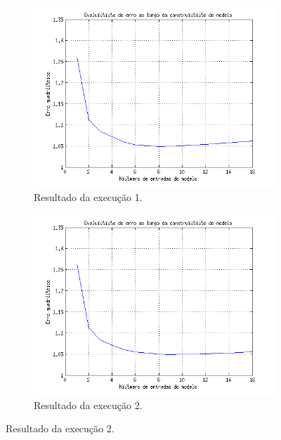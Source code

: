 \begin{figure}[H] 
				
			\centering
			
				\begin{subfigure}{.5\textwidth}
				  \centering
				  \includegraphics[width=1\linewidth]{image/forward1_2}
				  \caption{Resultado da execução 1.}
				  \label{forward1_2}
				\end{subfigure}%
				\begin{subfigure}{.5\textwidth}
				  \centering
				  \includegraphics[width=1\linewidth]{image/forward2_2}
				  \caption{Resultado da execução 2.}
				  \label{forward2_2}
			\end{subfigure}
			

\end{figure}
